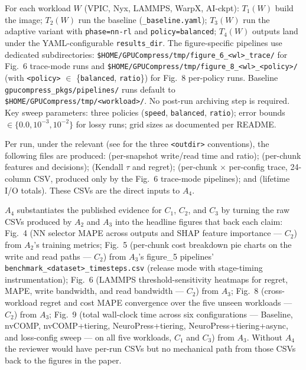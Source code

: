 \documentclass[conference]{IEEEtran}
\begin{document}
\artcomp
For each workload $W$ (VPIC, Nyx, LAMMPS, WarpX, AI-ckpt):
$T_1(W)$ build the image; $T_2(W)$ run the baseline
(\texttt{\_baseline.yaml}); $T_3(W)$ run the adaptive variant
with \texttt{phase=nn-rl} and \texttt{policy=balanced};
$T_4(W)$ outputs land under the YAML-configurable
\texttt{results\_dir}. The figure-specific pipelines use
dedicated subdirectories:
\texttt{\$HOME/GPUCompress/tmp/figure\_6\_<wl>\_trace/} for
Fig.~6 trace-mode runs and
\texttt{\$HOME/GPUCompress/tmp/figure\_8\_<wl>\_<policy>/}
(with \texttt{<policy>} $\in$ \{\texttt{balanced},
\texttt{ratio}\}) for Fig.~8 per-policy runs. Baseline
\texttt{gpucompress\_pkgs/pipelines/} runs default to
\texttt{\$HOME/GPUCompress/tmp/<workload>/}. No post-run
archiving step is required. Key sweep parameters: three
policies (\texttt{speed}, \texttt{balanced}, \texttt{ratio});
error bounds $\in \{0.0, 10^{-3}, 10^{-2}\}$ for lossy runs;
grid sizes as documented per README.

\artout
Per run, under the relevant
 (see \artcomp{} for
the three \texttt{<outdir>} conventions), the following files
are produced:
 (per-snapshot write/read time
and ratio);
 (per-chunk features and
decisions);
 (Kendall $\tau$ and regret);
 (per-chunk $\times$ per-config
trace, 24-column CSV, produced only by the Fig.~6 trace-mode
pipelines);
and
 (lifetime I/O totals).
These CSVs are the direct inputs to $A_4$.


\newartifact

$A_4$ substantiates the published evidence for $C_1$, $C_2$,
and $C_3$ by turning the raw CSVs produced by $A_2$ and $A_3$
into the headline figures that back each claim:
Fig.~4 (NN selector MAPE across outputs and SHAP feature
importance --- $C_2$) from $A_2$'s training metrics;
Fig.~5 (per-chunk cost breakdown pie charts on the write
and read paths --- $C_2$) from $A_3$'s figure\_5 pipelines'
\texttt{benchmark\_<dataset>\_timesteps.csv} (release mode
with stage-timing instrumentation);
Fig.~6 (LAMMPS threshold-sensitivity heatmaps for regret, MAPE,
write bandwidth, and read bandwidth --- $C_2$) from $A_3$;
Fig.~8 (cross-workload regret and cost MAPE convergence over
the five unseen workloads --- $C_2$) from $A_3$;
Fig.~9 (total wall-clock time across six configurations ---
Baseline, nvCOMP, nvCOMP+tiering, NeuroPress+tiering,
NeuroPress+tiering+async, and loss-config sweep --- on all
five workloads, $C_1$ and $C_3$) from $A_3$. Without $A_4$ the
reviewer would have per-run CSVs but no mechanical path from
those CSVs back to the figures in the paper.
\end{document}
